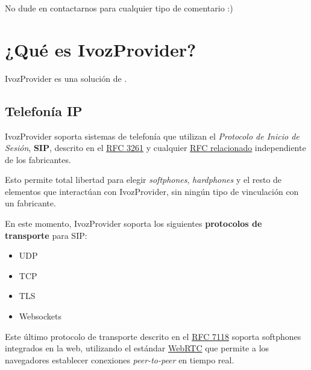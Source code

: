 \documentclass[letterpaper,10pt,spanish]{sphinxmanual}
\begin{document}
No dude en contactarnos para cualquier tipo de comentario :)


\section{¿Qué es IvozProvider?}
\label{basic_concepts/intro/what_is_ivozprovider::doc}\label{basic_concepts/intro/what_is_ivozprovider:what-is-ivozprovider}
IvozProvider es una solución de {\hyperref[basic_concepts/intro/what_is_ivozprovider:voip]{}} {\hyperref[basic_concepts/intro/what_is_ivozprovider:multilevel]{}} {\hyperref[basic_concepts/intro/what_is_ivozprovider:operator\string-oriented]{}} {\hyperref[basic_concepts/intro/what_is_ivozprovider:exposed]{}}.


\subsection{Telefonía IP}
\label{basic_concepts/intro/what_is_ivozprovider:ip-telephony}\label{basic_concepts/intro/what_is_ivozprovider:voip}
IvozProvider soporta sistemas de telefonía que utilizan el \emph{Protocolo de Inicio de Sesión}, \textbf{SIP}, descrito en el \href{https://tools.ietf.org/html/rfc3261}{RFC 3261} y cualquier \href{https://www.packetizer.com/ipmc/sip/standards.html}{RFC relacionado} independiente de los fabricantes.

Esto permite total libertad para elegir \emph{softphones}, \emph{hardphones} y el resto de elementos que interactúan con IvozProvider, sin ningún tipo de vinculación con un fabricante.

En este momento, IvozProvider soporta los siguientes \textbf{protocolos de transporte} para SIP:
\begin{itemize}
\item {} 
UDP

\item {} 
TCP

\item {} 
TLS

\item {} 
Websockets

\end{itemize}

Este último protocolo de transporte descrito en el \href{https://tools.ietf.org/html/rfc7118}{RFC 7118} soporta softphones integrados en la web, utilizando el estándar \href{https://webrtc.org/}{WebRTC} que permite a los navegadores establecer conexiones \emph{peer-to-peer} en tiempo real.
\end{document}
